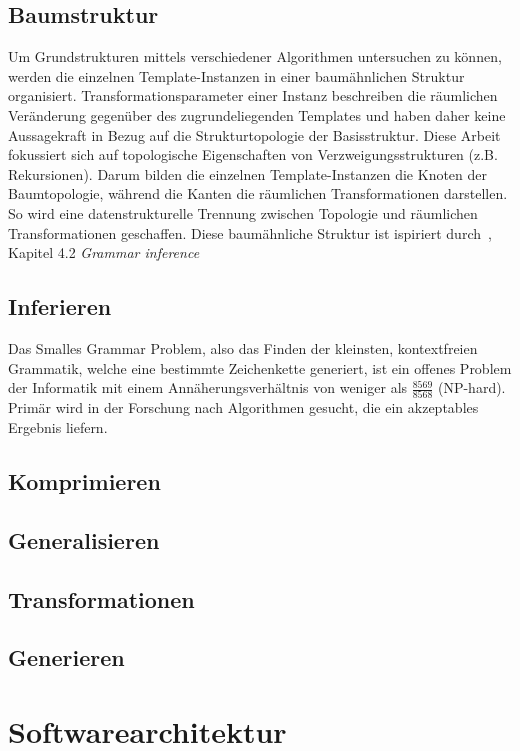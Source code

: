 \subsection*{Baumstruktur}
Um Grundstrukturen mittels verschiedener Algorithmen untersuchen zu können, werden die einzelnen Template-Instanzen in
einer baumähnlichen Struktur organisiert.
Transformationsparameter einer Instanz beschreiben die räumlichen Veränderung gegenüber des zugrundeliegenden Templates
und haben daher keine Aussagekraft in Bezug auf die Strukturtopologie der Basisstruktur.
Diese Arbeit fokussiert sich auf topologische Eigenschaften von Verzweigungsstrukturen (z.B. Rekursionen).
Darum bilden die einzelnen Template-Instanzen die Knoten der Baumtopologie, während die Kanten die räumlichen Transformationen
darstellen.
So wird eine datenstrukturelle Trennung zwischen Topologie und räumlichen Transformationen geschaffen.
Diese baumähnliche Struktur ist ispiriert durch~\cite{guo_2020}, Kapitel 4.2 \textit{Grammar inference}

\subsection*{Inferieren}
Das Smalles Grammar Problem, also das Finden der kleinsten, kontextfreien Grammatik, welche eine bestimmte Zeichenkette
generiert, ist ein offenes Problem der Informatik mit einem Annäherungsverhältnis von weniger als $\frac{8569}{8568}$
(NP-hard).
Primär wird in der Forschung nach Algorithmen gesucht, die ein akzeptables Ergebnis liefern.


\subsection*{Komprimieren}
\subsection*{Generalisieren}
\subsection*{Transformationen}
\subsection*{Generieren}

\section{Softwarearchitektur}

